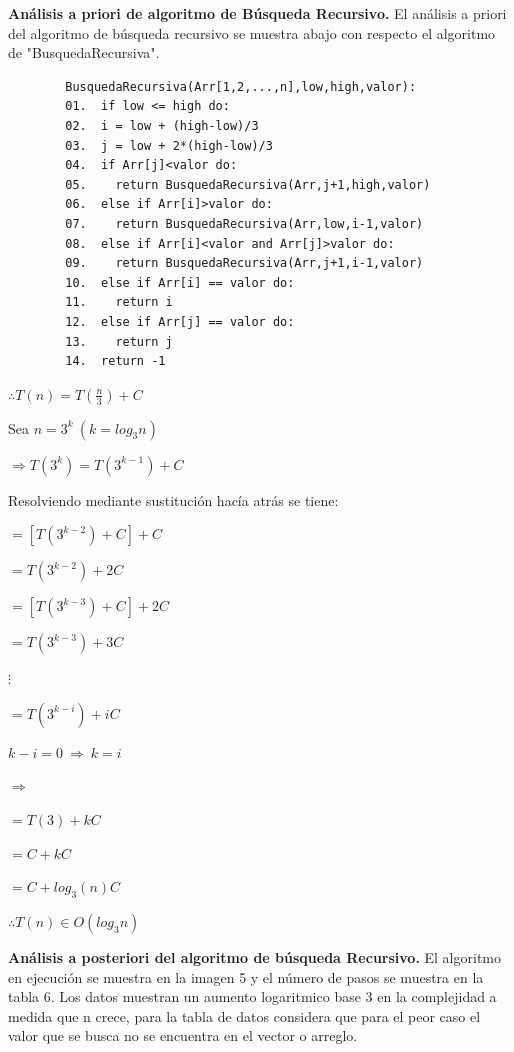 \documentclass[12pt,twoside]{article}
\begin{document}
\newpage


\textbf{Análisis a priori de algoritmo de Búsqueda Recursivo.} 
El análisis a priori del algoritmo de búsqueda recursivo se muestra abajo con respecto el algoritmo de "BusquedaRecursiva". 
\par
\begin{center}
  \begin{verbatim}
        BusquedaRecursiva(Arr[1,2,...,n],low,high,valor):
        01.  if low <= high do:
        02.  i = low + (high-low)/3
        03.  j = low + 2*(high-low)/3
        04.  if Arr[j]<valor do:
        05.    return BusquedaRecursiva(Arr,j+1,high,valor)
        06.  else if Arr[i]>valor do:
        07.    return BusquedaRecursiva(Arr,low,i-1,valor)
        08.  else if Arr[i]<valor and Arr[j]>valor do:
        09.    return BusquedaRecursiva(Arr,j+1,i-1,valor)
        10.  else if Arr[i] == valor do:
        11.    return i
        12.  else if Arr[j] == valor do:
        13.    return j
        14.  return -1
  \end{verbatim}
  \end{center}

\begin{center}
  $\therefore T(n)=T(\frac{n}{3})+C$

  Sea $n=3^k\ (k=log_3 n)$
  
  $\Rightarrow T(3^k)=T(3^{k-1})+C$
  \par
  Resolviendo mediante sustitución hacía atrás se tiene:

  $=[T(3^{k-2})+C]+C$

  $=T(3^{k-2})+2C$

  $=[T(3^{k-3})+C]+2C$

  $=T(3^{k-3})+3C$

  $\vdots$

  $=T(3^{k-i})+iC$

  $k-i=0\ \Rightarrow \ k=i$

  $\Rightarrow$

  $=T(3)+kC$

  $=C+kC$

  $=C+log_3(n)C$

  $\therefore T(n)\in O(log_3n)$
\end{center}

\textbf{Análisis a posteriori del algoritmo de búsqueda Recursivo.}
El algoritmo en ejecución se muestra en la imagen 5 y el número de pasos se muestra en la tabla 6. Los datos
muestran un aumento logaritmico base 3 en la complejidad a medida que n crece, para la tabla de datos considera
que para el peor caso el valor que se busca no se encuentra en el vector o arreglo.
\par
\end{document}
